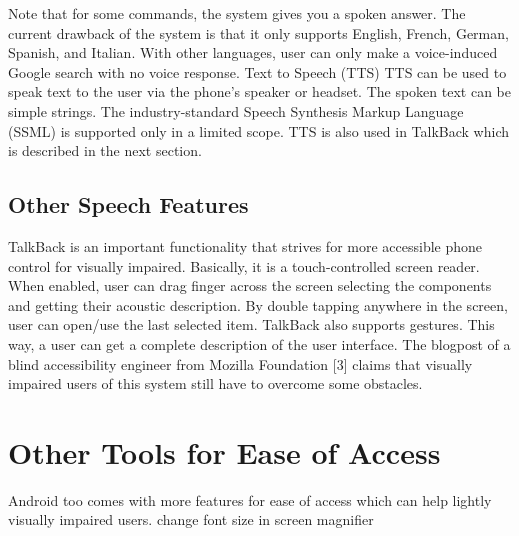 Note that for some commands, the system gives you a spoken answer. The current drawback of the system is that it only supports English, French, German, Spanish, and Italian. With other languages, user can only make a voice-induced Google search with no voice response.
Text to Speech (TTS)
TTS can be used to speak text to the user via the phone’s speaker or headset. The spoken text can be simple strings. The industry-standard Speech Synthesis Markup Language (SSML) is supported only in a limited scope. TTS is also used in TalkBack which is described in the next section.
\subsection{Other Speech Features}
TalkBack is an important functionality that strives for more accessible phone control for visually impaired. Basically, it is a touch-controlled screen reader. When enabled, user can drag finger across the screen selecting the components and getting their acoustic description. By double tapping anywhere in the screen, user can open/use the last selected item. TalkBack also supports gestures. This way, a user can get a complete description of the user interface. The blogpost of a blind accessibility engineer from Mozilla Foundation [3] claims that visually impaired users of this system still have to overcome some obstacles.

\section{Other Tools for Ease of Access}
Android too comes with more features for ease of access which can help lightly visually impaired users.
change font size in 
screen magnifier

\endinput
